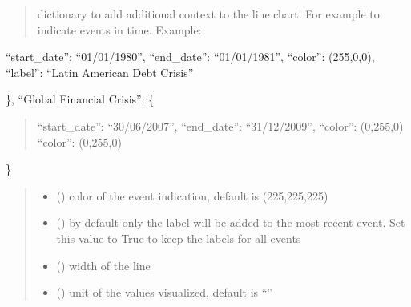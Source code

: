 \documentclass[letterpaper,10pt,english]{sphinxmanual}
\begin{document}
\begin{fulllineitems}
\begin{quote}
\begin{description}
\begin{itemize}
\end{itemize}

\sphinxAtStartPar
dictionary to add additional context to the line chart. For example to indicate events in time. Example:

\end{description}\end{quote}
\begin{description}
\begin{description}
\sphinxAtStartPar
“start\_date”: “01/01/1980”,
“end\_date”: “01/01/1981”,
“color”: (255,0,0),
“label”: “Latin American Debt Crisis”

\end{description}

\sphinxAtStartPar
\},
“Global Financial Crisis”: \{
\begin{quote}

\sphinxAtStartPar
“start\_date”: “30/06/2007”,
“end\_date”: “31/12/2009”,
“color”: (0,255,0)
“color”: (0,255,0)
\end{quote}

\sphinxAtStartPar
\}

\end{description}
\begin{quote}\begin{description}
\begin{itemize}
\item {} 
\sphinxAtStartPar
{} () \textendash{} color of the event indication, default is (225,225,225)

\item {} 
\sphinxAtStartPar
{} () \textendash{} by default only the label will be added to the most recent event. Set this value to True to keep the labels for all events

\item {} 
\sphinxAtStartPar
{} () \textendash{} width of the line

\item {} 
\sphinxAtStartPar
{} () \textendash{} unit of the values visualized, default is “”


\end{itemize}
\end{description}
\end{quote}
\end{fulllineitems}
\end{document}
